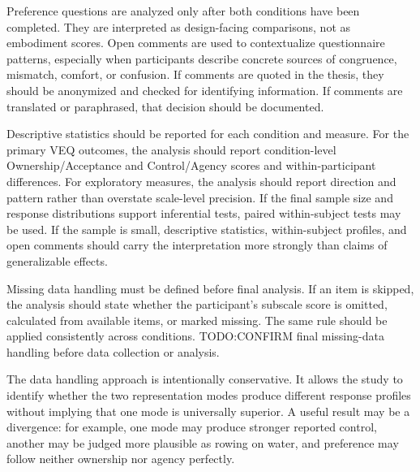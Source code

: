 Preference questions are analyzed only after both conditions have been completed.
They are interpreted as design-facing comparisons, not as embodiment scores.
Open comments are used to contextualize questionnaire patterns, especially when participants describe concrete sources of congruence, mismatch, comfort, or confusion.
If comments are quoted in the thesis, they should be anonymized and checked for identifying information.
If comments are translated or paraphrased, that decision should be documented.

Descriptive statistics should be reported for each condition and measure.
For the primary VEQ outcomes, the analysis should report condition-level Ownership/Acceptance and Control/Agency scores and within-participant differences.
For exploratory measures, the analysis should report direction and pattern rather than overstate scale-level precision.
If the final sample size and response distributions support inferential tests, paired within-subject tests may be used.
If the sample is small, descriptive statistics, within-subject profiles, and open comments should carry the interpretation more strongly than claims of generalizable effects.

Missing data handling must be defined before final analysis.
If an item is skipped, the analysis should state whether the participant's subscale score is omitted, calculated from available items, or marked missing.
The same rule should be applied consistently across conditions.
TODO:CONFIRM final missing-data handling before data collection or analysis.

The data handling approach is intentionally conservative.
It allows the study to identify whether the two representation modes produce different response profiles without implying that one mode is universally superior.
A useful result may be a divergence: for example, one mode may produce stronger reported control, another may be judged more plausible as rowing on water, and preference may follow neither ownership nor agency perfectly.